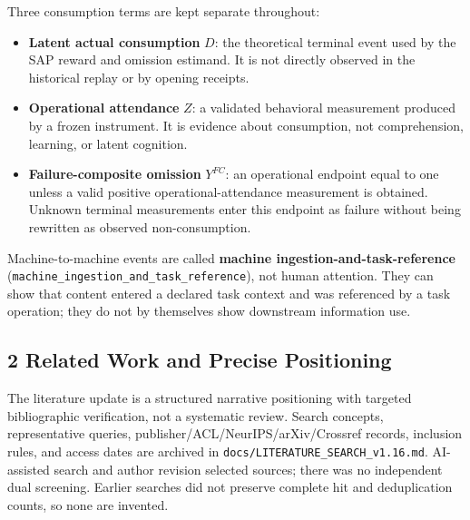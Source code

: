 \documentclass[
  11pt]{article}
\providecommand{\tightlist}{%
  \setlength{\itemsep}{0pt}\setlength{\parskip}{0pt}}
\begin{document}
Three consumption terms are kept separate throughout:

\begin{itemize}
\tightlist
\item
  \textbf{Latent actual consumption} \(D\): the theoretical terminal
  event used by the SAP reward and omission estimand. It is not directly
  observed in the historical replay or by opening receipts.
\item
  \textbf{Operational attendance} \(Z\): a validated behavioral
  measurement produced by a frozen instrument. It is evidence about
  consumption, not comprehension, learning, or latent cognition.
\item
  \textbf{Failure-composite omission} \(Y^{FC}\): an operational
  endpoint equal to one unless a valid positive operational-attendance
  measurement is obtained. Unknown terminal measurements enter this
  endpoint as failure without being rewritten as observed
  non-consumption.
\end{itemize}

Machine-to-machine events are called \textbf{machine
ingestion-and-task-reference}
(\texttt{machine\_ingestion\_and\_task\_reference}), not human
attention. They can show that content entered a declared task context
and was referenced by a task operation; they do not by themselves show
downstream information use.

\subsection{2 Related Work and Precise
Positioning}\label{related-work-and-precise-positioning}

The literature update is a structured narrative positioning with
targeted bibliographic verification, not a systematic review. Search
concepts, representative queries, publisher/ACL/NeurIPS/arXiv/Crossref
records, inclusion rules, and access dates are archived in
\texttt{docs/LITERATURE\_SEARCH\_v1.16.md}. AI-assisted search and
author revision selected sources; there was no independent dual
screening. Earlier searches did not preserve complete hit and
deduplication counts, so none are invented.
\end{document}
